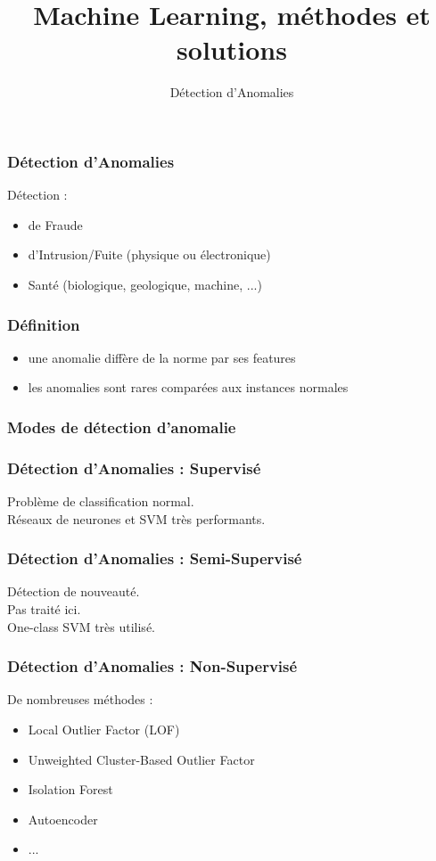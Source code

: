 \documentclass{formation}
\title{Machine Learning, méthodes et solutions}
\subtitle{Détection d'Anomalies}
\begin{document}
\maketitle

\begin{frame}
  \frametitle{Détection d'Anomalies}
  Détection :
  \begin{itemize}
  \item de Fraude
  \item d'Intrusion/Fuite (physique ou électronique)
  \item Santé (biologique, geologique, machine, ...)
  \end{itemize}
\end{frame}

\begin{frame}
  \frametitle{Définition}
  \begin{itemize}
  \item une anomalie diffère de la norme par ses features
  \item les anomalies sont rares comparées aux instances normales
  \end{itemize}
\end{frame}

\begin{frame}
  \frametitle{Modes de détection d'anomalie}
\end{frame}

\begin{frame}
  \frametitle{Détection d'Anomalies : Supervisé}
  Problème de classification normal. \\
  Réseaux de neurones et SVM très performants.
\end{frame}

\begin{frame}
  \frametitle{Détection d'Anomalies : Semi-Supervisé}
  Détection de nouveauté. \\
  Pas traité ici. \\
  One-class SVM très utilisé.
\end{frame}

\begin{frame}
  \frametitle{Détection d'Anomalies : Non-Supervisé}
  De nombreuses méthodes : 
  \begin{itemize}
  \item Local Outlier Factor (LOF)
  \item Unweighted Cluster-Based Outlier Factor
  \item Isolation Forest
  \item Autoencoder
  \item ...
  \end{itemize}
\end{frame}
\end{document}
